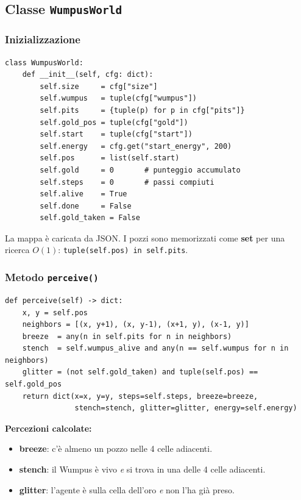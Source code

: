 \documentclass[12pt,a4paper]{article}
\begin{document}
\subsection{Classe \texttt{WumpusWorld}}

\subsubsection{Inizializzazione}

\begin{lstlisting}[language=Python3]
class WumpusWorld:
    def __init__(self, cfg: dict):
        self.size     = cfg["size"]
        self.wumpus   = tuple(cfg["wumpus"])
        self.pits     = {tuple(p) for p in cfg["pits"]}
        self.gold_pos = tuple(cfg["gold"])
        self.start    = tuple(cfg["start"])
        self.energy   = cfg.get("start_energy", 200)
        self.pos      = list(self.start)
        self.gold     = 0       # punteggio accumulato
        self.steps    = 0       # passi compiuti
        self.alive    = True
        self.done     = False
        self.gold_taken = False
\end{lstlisting}

La mappa è caricata da JSON. I pozzi sono memorizzati come \textbf{set} per
una ricerca $O(1)$: \texttt{tuple(self.pos) in self.pits}.

\subsubsection{Metodo \texttt{perceive()}}

\begin{lstlisting}[language=Python3]
def perceive(self) -> dict:
    x, y = self.pos
    neighbors = [(x, y+1), (x, y-1), (x+1, y), (x-1, y)]
    breeze  = any(n in self.pits for n in neighbors)
    stench  = self.wumpus_alive and any(n == self.wumpus for n in neighbors)
    glitter = (not self.gold_taken) and tuple(self.pos) == self.gold_pos
    return dict(x=x, y=y, steps=self.steps, breeze=breeze,
                stench=stench, glitter=glitter, energy=self.energy)
\end{lstlisting}

\textbf{Percezioni calcolate:}
\begin{itemize}[noitemsep]
  \item \textbf{breeze}: c'è almeno un pozzo nelle 4 celle adiacenti.
  \item \textbf{stench}: il Wumpus è vivo \emph{e} si trova in una delle 4 celle adiacenti.
  \item \textbf{glitter}: l'agente è sulla cella dell'oro \emph{e} non l'ha già preso.
\end{itemize}
\end{document}
